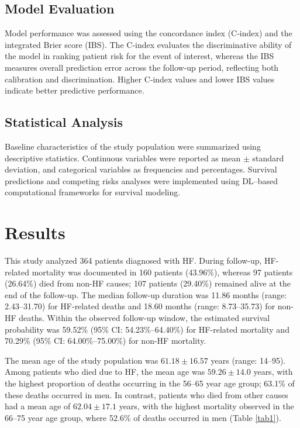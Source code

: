 \documentclass[twoside]{article}
\begin{document}
\subsection{Model Evaluation}
Model performance was assessed using the concordance index (C‑index) and the integrated Brier score (IBS). The C‑index evaluates the discriminative ability of the model in ranking patient risk for the event of interest, whereas the IBS measures overall prediction error across the follow‑up period, reflecting both calibration and discrimination. Higher C‑index values and lower IBS values indicate better predictive performance.

\subsection{Statistical Analysis}
Baseline characteristics of the study population were summarized using descriptive statistics. Continuous variables were reported as mean $\pm$ standard deviation, and categorical variables as frequencies and percentages. Survival predictions and competing risks analyses were implemented using DL–based computational frameworks for survival modeling.

\section{Results}
This study analyzed 364 patients diagnosed with HF. During follow-up, HF-related mortality was documented in 160 patients (43.96\%), whereas 97 patients (26.64\%) died from non-HF causes; 107 patients (29.40\%) remained alive at the end of the follow-up. The median follow-up duration was 11.86 months (range: 2.43–31.70) for HF-related deaths and 18.60 months (range: 8.73–35.73) for non-HF deaths. 
Within the observed follow-up window, the estimated survival probability was 59.52\% (95\% CI: 54.23\%–64.40\%) for HF-related mortality and 70.29\% (95\% CI: 64.00\%–75.00\%) for non-HF mortality. 

The mean age of the study population was $61.18 \pm 16.57$ years (range: 14--95). Among patients who died due to HF, the mean age was $59.26 \pm 14.0$ years, with the highest proportion of deaths occurring in the 56--65 year age group; 63.1\% of these deaths occurred in men. In contrast, patients who died from other causes had a mean age of $62.04 \pm 17.1$ years, with the highest mortality observed in the 66--75 year age group, where 52.6\% of deaths occurred in men (Table \ref{tab1}).
\end{document}
